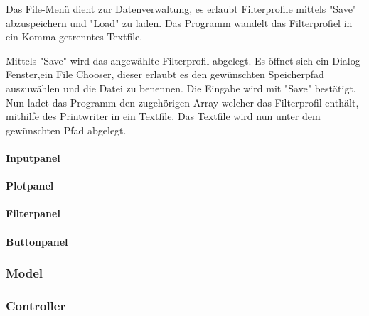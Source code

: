 Das File-Menü dient zur Datenverwaltung, es erlaubt Filterprofile mittels "Save" abzuspeichern und "Load" zu laden. 
Das Programm wandelt das Filterprofiel in ein Komma-getrenntes Textfile.

Mittels "Save" wird das angewählte Filterprofil abgelegt. Es öffnet sich ein Dialog-Fenster,ein File Chooser, dieser erlaubt es den gewünschten Speicherpfad auszuwählen und die Datei zu benennen. Die Eingabe wird mit "Save" bestätigt. Nun ladet das Programm den zugehörigen Array welcher das Filterprofil enthält, mithilfe des Printwriter in ein Textfile. Das Textfile wird nun unter dem gewünschten Pfad abgelegt. 

\paragraph{Inputpanel} \label{par:inputpanel}

\paragraph{Plotpanel} \label{par:plotpanel}

\paragraph{Filterpanel} \label{par:filterpanel}

\paragraph{Buttonpanel} \label{par:buttonpanel}


\subsubsection{Model}\label{subsubsec:model}

\subsubsection{Controller}\label{subsubsec:Controller}




